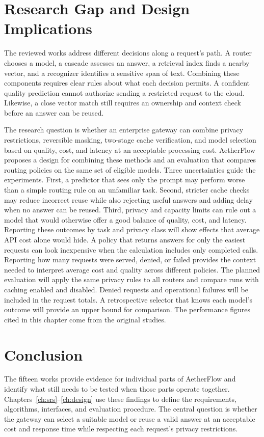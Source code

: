 \documentclass{FastFyp}
\begin{document}
\section{Research Gap and Design Implications}
The reviewed works address different decisions along a request's path. A router chooses a model, a cascade assesses an answer, a retrieval index finds a nearby vector, and a recognizer identifies a sensitive span of text. Combining these components requires clear rules about what each decision permits. A confident quality prediction cannot authorize sending a restricted request to the cloud. Likewise, a close vector match still requires an ownership and context check before an answer can be reused.

The research question is whether an enterprise gateway can combine privacy restrictions, reversible masking, two-stage cache verification, and model selection based on quality, cost, and latency at an acceptable processing cost. AetherFlow proposes a design for combining these methods and an evaluation that compares routing policies on the same set of eligible models.
Three uncertainties guide the experiments. First, a predictor that sees only the prompt may perform worse than a simple routing rule on an unfamiliar task. Second, stricter cache checks may reduce incorrect reuse while also rejecting useful answers and adding delay when no answer can be reused. Third, privacy and capacity limits can rule out a model that would otherwise offer a good balance of quality, cost, and latency. Reporting these outcomes by task and privacy class will show effects that average API cost alone would hide. A policy that returns answers for only the easiest requests can look inexpensive when the calculation includes only completed calls. Reporting how many requests were served, denied, or failed provides the context needed to interpret average cost and quality across different policies.
The planned evaluation will apply the same privacy rules to all routers and compare runs with caching enabled and disabled. Denied requests and operational failures will be included in the request totals. A retrospective selector that knows each model's outcome will provide an upper bound for comparison. The performance figures cited in this chapter come from the original studies.

\section{Conclusion}
The fifteen works provide evidence for individual parts of AetherFlow and identify what still needs to be tested when those parts operate together. Chapters~\ref{ch:srs}--\ref{ch:design} use these findings to define the requirements, algorithms, interfaces, and evaluation procedure. The central question is whether the gateway can select a suitable model or reuse a valid answer at an acceptable cost and response time while respecting each request's privacy restrictions.
\end{document}

